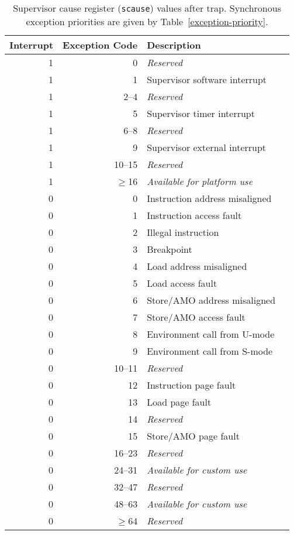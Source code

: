 \begin{table*}[h!]
\begin{center}
\begin{tabular}{|r|r|l|l|}
  \hline
  Interrupt & Exception Code  & Description \\
  \hline	 
  1         & 0               & {\em Reserved} \\
  1         & 1               & Supervisor software interrupt \\
  1         & 2--4            & {\em Reserved} \\
  1         & 5               & Supervisor timer interrupt \\
  1         & 6--8            & {\em Reserved} \\
  1         & 9               & Supervisor external interrupt \\
  1         & 10--15          & {\em Reserved} \\
  1         & $\ge$16         & {\em Available for platform use} \\ \hline
  0         & 0               & Instruction address misaligned \\
  0         & 1               & Instruction access fault \\
  0         & 2               & Illegal instruction \\   
  0         & 3               & Breakpoint \\
  0         & 4               & Load address misaligned \\
  0         & 5               & Load access fault \\
  0         & 6               & Store/AMO address misaligned \\
  0         & 7               & Store/AMO access fault \\
  0         & 8               & Environment call from U-mode \\
  0         & 9               & Environment call from S-mode \\
  0         & 10--11          & {\em Reserved} \\
  0         & 12              & Instruction page fault \\
  0         & 13              & Load page fault \\
  0         & 14              & {\em Reserved} \\
  0         & 15              & Store/AMO page fault \\
  0         & 16--23          & {\em Reserved} \\
  0         & 24--31          & {\em Available for custom use} \\
  0         & 32--47          & {\em Reserved} \\
  0         & 48--63          & {\em Available for custom use} \\
  0         & $\ge$64         & {\em Reserved} \\
  \hline
\end{tabular}
\end{center}
\caption{Supervisor cause register ({\tt scause}) values after trap.
Synchronous exception priorities are given by Table~\ref{exception-priority}.}
\label{scauses}
\end{table*}

